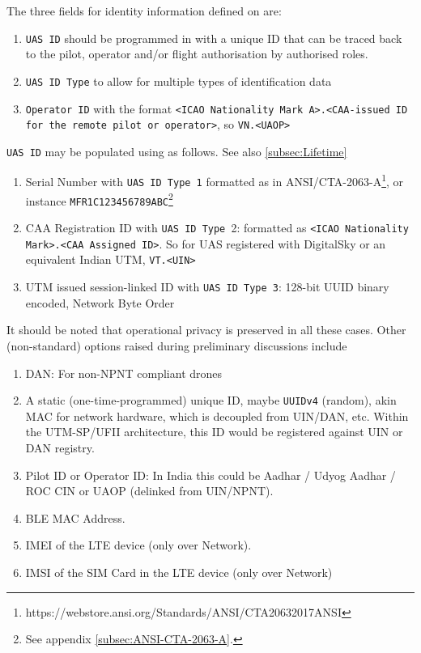 \documentclass{ua_wgs_base}
\begin{document}
The three fields for identity information defined on \cite[p10]{ASTM:F3411:19}
are:
\begin{enumerate}
\item \texttt{UAS ID} should be programmed in with a unique ID that can
be traced back to the pilot, operator and/or flight authorisation
by authorised roles.
\item \texttt{UAS ID Type} to allow for multiple types of identification
data
\item \texttt{Operator ID} with the format \texttt{<ICAO Nationality Mark
A>.<CAA-issued ID for the remote pilot or operator>}, so \texttt{VN.<UAOP>}
\end{enumerate}
\texttt{UAS ID} may be populated using as follows. See also \ref{subsec:Lifetime}
\begin{enumerate}
\item Serial Number with \texttt{UAS ID Type 1} formatted as in ANSI/CTA-2063-A\footnote{https://webstore.ansi.org/Standards/ANSI/CTA20632017ANSI},
or instance \texttt{MFR1C123456789ABC}\footnote{See appendix \ref{subsec:ANSI-CTA-2063-A}.}
\item CAA Registration
ID with \texttt{UAS ID Type }2: formatted as \texttt{<ICAO Nationality
Mark>.<CAA Assigned ID>}. So for UAS registered with DigitalSky or
an equivalent Indian UTM, \texttt{VT.<UIN>}
\item UTM issued session-linked ID with \texttt{UAS ID Type 3}: 128-bit
UUID binary encoded, Network Byte Order
\end{enumerate}
It should be noted that operational privacy is preserved in all these
cases. Other (non-standard) options raised during preliminary discussions
include
\begin{enumerate}
\item DAN: For non-NPNT compliant drones
\item A static (one-time-programmed) unique ID, maybe \texttt{UUIDv4} (random),
akin MAC for network hardware, which is decoupled from UIN/DAN, etc.
Within the UTM-SP/UFII architecture, this ID would be registered against
UIN or DAN registry.
\item Pilot ID or Operator ID: In India this could be Aadhar / Udyog Aadhar
/ ROC CIN or UAOP (delinked from UIN/NPNT). 
\item BLE MAC Address. 
\item IMEI of the LTE device (only over Network). 
\item IMSI of the SIM Card in the LTE device (only over Network)
\end{enumerate}
\end{document}
